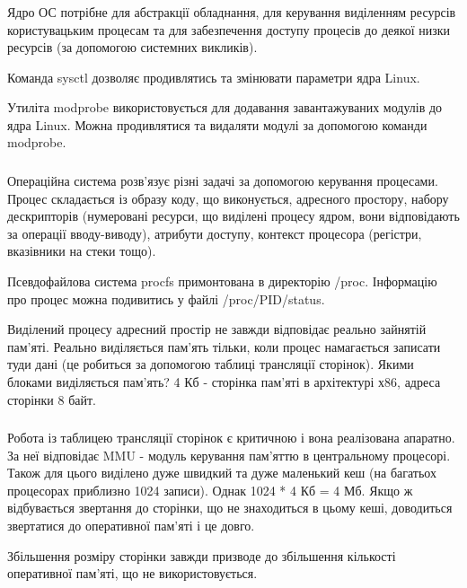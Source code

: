\documentclass[t]{beamer}  %
\begin{document}
 \begin{frame}
 	\frametitle{\insertsection} 
 	\framesubtitle{\insertsubsection}
Ядро ОС потрібне для абстракції обладнання, для керування виділенням ресурсів користувацьким процесам  та для забезпечення доступу процесів до деякої низки ресурсів (за допомогою системних викликів).

Команда sysctl дозволяє продивлятись та змінювати параметри ядра Linux.

Утиліта modprobe використовується для додавання завантажуваних модулів до ядра Linux. Можна продивлятися та видаляти модулі за допомогою команди modprobe.
\end{frame}

\begin{frame}
 	\frametitle{\insertsection} 
 	\framesubtitle{\insertsubsection}
Операційна система розв'язує різні задачі за допомогою керування процесами. Процес складається із образу коду, що виконується, адресного простору, набору дескрипторів (нумеровані ресурси, що виділені процесу ядром, вони відповідають за операції вводу-виводу), атрибути доступу, контекст процесора (регістри, вказівники на стеки тощо).

Псевдофайлова система procfs примонтована в директорію /proc. Інформацію про процес можна подивитись у файлі /proc/PID/status.

Виділений процесу адресний простір не завжди відповідає реально зайнятій пам'яті. Реально виділяється пам'ять тільки, коли процес намагається записати туди дані (це робиться за допомогою таблиці трансляції сторінок). Якими блоками виділяється пам'ять? 4 Кб - сторінка пам'яті в архітектурі х86, адреса сторінки 8 байт. 
\end{frame}

\begin{frame}
 	\frametitle{\insertsection} 
 	\framesubtitle{\insertsubsection}
Робота із таблицею трансляції сторінок є критичною і вона реалізована апаратно. За неї відповідає MMU - модуль керування пам'яттю в центральному процесорі. Також для цього виділено дуже швидкий та дуже маленький кеш (на багатьох процесорах приблизно 1024 записи). Однак 1024 * 4 Кб = 4 Мб. Якщо ж відбувається звертання до сторінки, що не знаходиться в цьому кеші, доводиться звертатися до оперативної пам'яті і це довго. 

Збільшення розміру сторінки завжди призводе до збільшення кількості оперативної пам'яті, що не використовується.

\end{frame}
\end{document}
